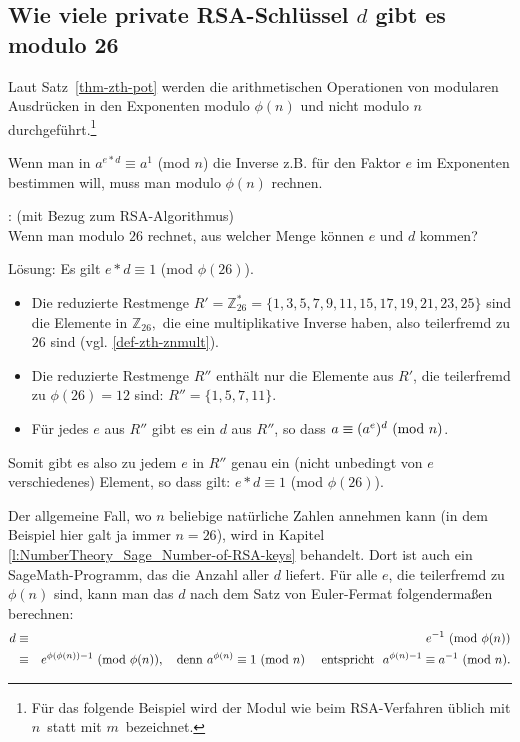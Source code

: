 \begin{refsegment}
\subsection{Wie viele private RSA-Schlüssel \texorpdfstring{$d$}{d} gibt es modulo 26}
\label{L_nt_Num-of-d-mod-26}

Laut Satz~\ref{thm-zth-pot} werden die arithmetischen Operationen von modularen
Ausdrücken in den Exponenten modulo $\phi(n)$ und nicht modulo $n$
durchgeführt.\footnote{%
Für das folgende Beispiel wird der Modul wie beim RSA-Verfahren üblich mit
\glqq $n$\grqq~statt mit \glqq $m$\grqq~bezeichnet.}

Wenn man in $a^{e*d} \equiv a^1$ (mod $n$) die Inverse z.B. für den Faktor $e$
im Exponenten bestimmen will, muss man modulo $\phi(n)$ rechnen.

\begin{example}{:} (mit Bezug zum RSA-Algorithmus)\\
Wenn man modulo $26$ rechnet, aus welcher Menge können $e$ und $d$ kommen?

Lösung: Es gilt $e*d \equiv 1$ (mod $\phi(26)$).
\begin{itemize}
   \item[] Die reduzierte Restmenge
$R' = \mathbb{Z}_{26}^* = \{ 1, 3, 5, 7, 9, 11, 15, 17, 19, 21, 23, 25 \}$ sind die
Elemente in $\mathbb{Z}_{26}, $ die eine multiplikative Inverse haben,
also teilerfremd
zu $26$ sind (vgl. \ref{def-zth-znmult}).
   \item[] Die reduzierte Restmenge $R''$ enthält nur die Elemente aus
           $R'$, die teilerfremd zu $\phi(26) = 12$ sind:
           $R'' = \{ 1, 5, 7, 11 \}$.
   \item[] Für jedes $e$ aus $R''$ gibt es ein $d$ aus $R''$, so dass
           $a \equiv (a^e)^d{\rm ~(mod~}n)$.
\end{itemize}
Somit gibt es also zu jedem $e$ in $R''$ genau ein (nicht unbedingt von
$e$ verschiedenes) Element, so dass gilt: $e*d \equiv 1$ (mod $\phi(26)$).

Der allgemeine Fall, wo $n$ beliebige natürliche Zahlen annehmen kann (in
dem Beispiel hier galt ja immer $n = 26$), wird in Kapitel
\ref{l:NumberTheory_Sage_Number-of-RSA-keys} behandelt. Dort ist auch ein
SageMath-Programm, das die Anzahl aller $d$ liefert. Für alle $e$, die
teilerfremd zu $\phi(n)$ sind, kann man
das $d$ nach dem Satz von Euler-Fermat folgendermaßen berechnen:
\begin{eqnarray*}
 d & \equiv & e^{-1}      {\rm ~(mod~} \phi(n)) \nonumber\\
   & \equiv & e^{\phi(\phi(n))-1}  {\rm ~(mod~} \phi(n)), \quad  {\rm denn~}  a^{\phi(n)} \equiv 1 {\rm ~(mod~} n)
      \quad {\rm ~entspricht~~} a^{\phi(n)-1} \equiv a^{-1} {\rm ~(mod~} n). \nonumber
\end{eqnarray*}
\end{example}


\end{refsegment}
